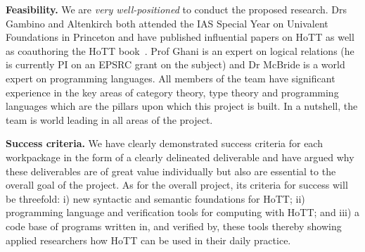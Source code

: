 \documentclass[a4paper,11pt]{article}
\begin{document}
\vspace*{0.02in}

{\bf Feasibility.} We are {\em very well-positioned} to conduct the
proposed research. Drs Gambino and Altenkirch both attended the IAS
Special Year on Univalent Foundations in Princeton and have published
influential papers on HoTT as well as coauthoring the HoTT book~\cite{hott-book}. Prof
Ghani is an expert on logical relations (he is currently PI on an
EPSRC grant on the subject) and Dr McBride is a world expert on
programming languages. All members of the team have significant
experience in the key areas of category theory, type theory and
programming languages which are the pillars upon which this project is
built. In a nutshell, the team is world leading in all areas of the
project.

\vspace*{0.02in}

{\bf Success criteria.} We have clearly demonstrated success criteria
for each workpackage in the form of a clearly delineated deliverable
and have argued why these deliverables are of great value individually
but also are essential to the overall goal of the project. As for the
overall project, its criteria for success will be threefold: i) new
syntactic and semantic foundations for HoTT; ii) programming language
and verification tools for computing with HoTT; and iii) a code base
of programs written in, and verified by, these tools thereby showing
applied researchers how HoTT can be used in their daily practice.


\vspace*{0.02in}
\end{document}
